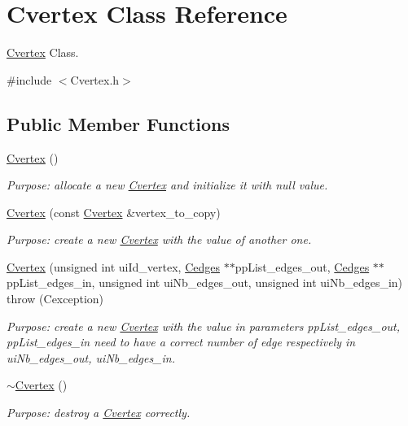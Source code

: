 \hypertarget{class_cvertex}{}\section{Cvertex Class Reference}
\label{class_cvertex}


\hyperlink{class_cvertex}{Cvertex} Class.  




{\ttfamily \#include $<$Cvertex.\+h$>$}

\subsection*{Public Member Functions}
\begin{DoxyCompactItemize}
\item 
\hyperlink{class_cvertex_a4256affe77ee305afaf51aa9fcbd1cf0}{Cvertex} ()
\begin{DoxyCompactList}\small\item\em Purpose\+: allocate a new \hyperlink{class_cvertex}{Cvertex} and initialize it with null value. \end{DoxyCompactList}\item 
\hyperlink{class_cvertex_a3c091dc9431a4144f9d97767dd996186}{Cvertex} (const \hyperlink{class_cvertex}{Cvertex} \&vertex\+\_\+to\+\_\+copy)
\begin{DoxyCompactList}\small\item\em Purpose\+: create a new \hyperlink{class_cvertex}{Cvertex} with the value of another one. \end{DoxyCompactList}\item 
\hyperlink{class_cvertex_a9a4fa4f830633c4adabd066c75ca148d}{Cvertex} (unsigned int ui\+Id\+\_\+vertex, \hyperlink{class_cedges}{Cedges} $\ast$$\ast$pp\+List\+\_\+edges\+\_\+out, \hyperlink{class_cedges}{Cedges} $\ast$$\ast$pp\+List\+\_\+edges\+\_\+in, unsigned int ui\+Nb\+\_\+edges\+\_\+out, unsigned int ui\+Nb\+\_\+edges\+\_\+in)  throw (\+Cexception)
\begin{DoxyCompactList}\small\item\em Purpose\+: create a new \hyperlink{class_cvertex}{Cvertex} with the value in parameters pp\+List\+\_\+edges\+\_\+out, pp\+List\+\_\+edges\+\_\+in need to have a correct number of edge respectively in ui\+Nb\+\_\+edges\+\_\+out, ui\+Nb\+\_\+edges\+\_\+in. \end{DoxyCompactList}\item 
\hyperlink{class_cvertex_a91b564020e4c5b73f971f8d4e35dd952}{$\sim$\+Cvertex} ()
\begin{DoxyCompactList}\small\item\em Purpose\+: destroy a \hyperlink{class_cvertex}{Cvertex} correctly. \end{DoxyCompactList}\item 

\end{DoxyCompactItemize}
